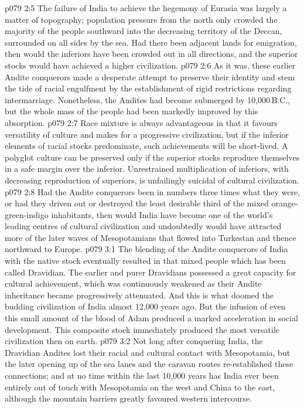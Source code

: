 \vs p079 2:5 The failure of India to achieve the hegemony of Eurasia was largely a matter of topography; population pressure from the north only crowded the majority of the people southward into the decreasing territory of the Deccan, surrounded on all sides by the sea. Had there been adjacent lands for emigration, then would the inferiors have been crowded out in all directions, and the superior stocks would have achieved a higher civilization.
\vs p079 2:6 As it was, these earlier Andite conquerors made a desperate attempt to preserve their identity and stem the tide of racial engulfment by the establishment of rigid restrictions regarding intermarriage. Nonetheless, the Andites had become submerged by 10,000\,B.C., but the whole mass of the people had been markedly improved by this absorption.
\vs p079 2:7 \pc Race mixture is always advantageous in that it favours versatility of culture and makes for a progressive civilization, but if the inferior elements of racial stocks predominate, such achievements will be short\hyp{}lived. A polyglot culture can be preserved only if the superior stocks reproduce themselves in a safe margin over the inferior. Unrestrained multiplication of inferiors, with decreasing reproduction of superiors, is unfailingly suicidal of cultural civilization.
\vs p079 2:8 Had the Andite conquerors been in numbers three times what they were, or had they driven out or destroyed the least desirable third of the mixed orange\hyp{}green\hyp{}indigo inhabitants, then would India have become one of the world’s leading centres of cultural civilization and undoubtedly would have attracted more of the later waves of Mesopotamians that flowed into Turkestan and thence northward to Europe.
\vs p079 3:1 The blending of the Andite conquerors of India with the native stock eventually resulted in that mixed people which has been called Dravidian. The earlier and purer Dravidians possessed a great capacity for cultural achievement, which was continuously weakened as their Andite inheritance became progressively attenuated. And this is what doomed the budding civilization of India almost 12,000 years ago. But the infusion of even this small amount of the blood of Adam produced a marked acceleration in social development. This composite stock immediately produced the most versatile civilization then on earth.
\vs p079 3:2 Not long after conquering India, the Dravidian Andites lost their racial and cultural contact with Mesopotamia, but the later opening up of the sea lanes and the caravan routes re\hyp{}established these connections; and at no time within the last 10,000 years has India ever been entirely out of touch with Mesopotamia on the west and China to the east, although the mountain barriers greatly favoured western intercourse.
